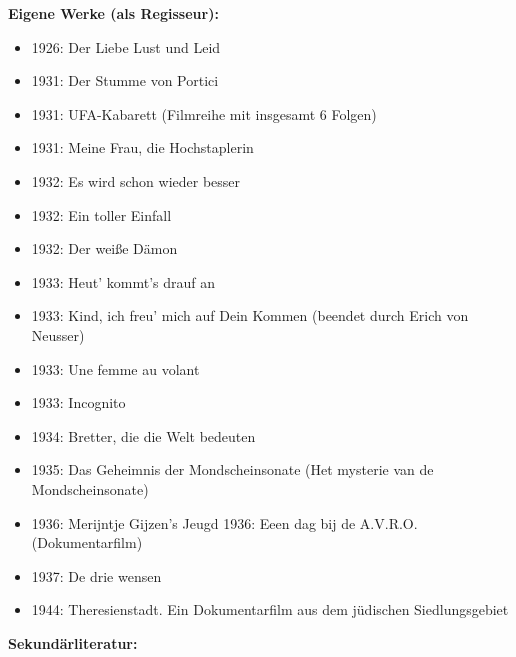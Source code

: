 \documentclass[a4paper]{article}
\begin{document}
\bigskip

\textbf{Eigene Werke (als Regisseur):}

\begin{itemize}
\item 1926: Der Liebe Lust und Leid  
\item 1931: Der Stumme von Portici  
\item 1931: UFA-Kabarett (Filmreihe mit insgesamt 6 Folgen)  
\item 1931: Meine Frau, die Hochstaplerin  
\item 1932: Es wird schon wieder besser  
\item 1932: Ein toller Einfall  
\item 1932: Der weiße Dämon  
\item 1933: Heut’ kommt’s drauf an  
\item 1933: Kind, ich freu’ mich auf Dein Kommen (beendet durch Erich von Neusser)  
\item 1933: Une femme au volant  
\item 1933: Incognito  
\item 1934: Bretter, die die Welt bedeuten  
\item 1935: Das Geheimnis der Mondscheinsonate (Het mysterie van de Mondscheinsonate)  
\item 1936: Merijntje Gijzen’s Jeugd  1936: Eeen dag bij de A.V.R.O.(Dokumentarfilm)  
\item 1937: De drie wensen  
\item 1944: Theresienstadt. Ein Dokumentarfilm aus dem jüdischen Siedlungsgebiet 
\end{itemize}

\bigskip

\textbf{Sekundärliteratur:}
\end{document}
